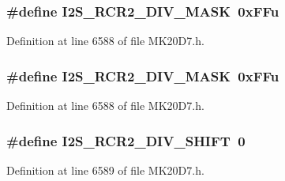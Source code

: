 \subsubsection[{\texorpdfstring{I2\+S\+\_\+\+R\+C\+R2\+\_\+\+D\+I\+V\+\_\+\+M\+A\+SK}{I2S_RCR2_DIV_MASK}}]{\setlength{\rightskip}{0pt plus 5cm}\#define I2\+S\+\_\+\+R\+C\+R2\+\_\+\+D\+I\+V\+\_\+\+M\+A\+SK~0x\+F\+Fu}\hypertarget{group___i2_s___register___masks_ga2a4f6e6b8d73e0abf6f0d5b0979182e2}{}\label{group___i2_s___register___masks_ga2a4f6e6b8d73e0abf6f0d5b0979182e2}


Definition at line 6588 of file M\+K20\+D7.\+h.

\subsubsection[{\texorpdfstring{I2\+S\+\_\+\+R\+C\+R2\+\_\+\+D\+I\+V\+\_\+\+M\+A\+SK}{I2S_RCR2_DIV_MASK}}]{\setlength{\rightskip}{0pt plus 5cm}\#define I2\+S\+\_\+\+R\+C\+R2\+\_\+\+D\+I\+V\+\_\+\+M\+A\+SK~0x\+F\+Fu}\hypertarget{group___i2_s___register___masks_ga2a4f6e6b8d73e0abf6f0d5b0979182e2}{}\label{group___i2_s___register___masks_ga2a4f6e6b8d73e0abf6f0d5b0979182e2}


Definition at line 6588 of file M\+K20\+D7.\+h.

\subsubsection[{\texorpdfstring{I2\+S\+\_\+\+R\+C\+R2\+\_\+\+D\+I\+V\+\_\+\+S\+H\+I\+FT}{I2S_RCR2_DIV_SHIFT}}]{\setlength{\rightskip}{0pt plus 5cm}\#define I2\+S\+\_\+\+R\+C\+R2\+\_\+\+D\+I\+V\+\_\+\+S\+H\+I\+FT~0}\hypertarget{group___i2_s___register___masks_gaa9a14126d11b963220e6b98c027be2e1}{}\label{group___i2_s___register___masks_gaa9a14126d11b963220e6b98c027be2e1}


Definition at line 6589 of file M\+K20\+D7.\+h.

